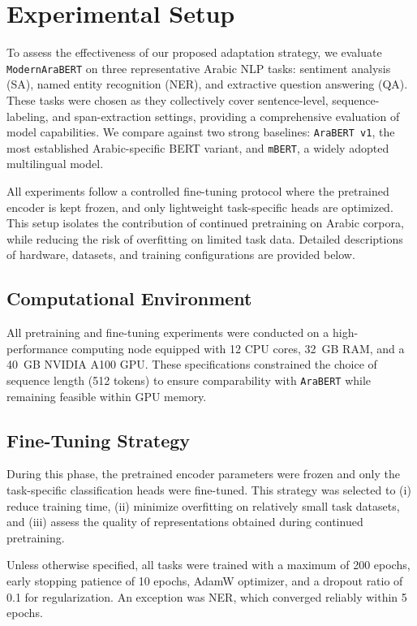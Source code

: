 \section{Experimental Setup}

To assess the effectiveness of our proposed adaptation strategy, we evaluate \texttt{ModernAraBERT} on three representative Arabic NLP tasks: sentiment analysis (SA), named entity recognition (NER), and extractive question answering (QA). These tasks were chosen as they collectively cover sentence-level, sequence-labeling, and span-extraction settings, providing a comprehensive evaluation of model capabilities. We compare against two strong baselines: \texttt{AraBERT v1}, the most established Arabic-specific BERT variant, and \texttt{mBERT}, a widely adopted multilingual model.  

All experiments follow a controlled fine-tuning protocol where the pretrained encoder is kept frozen, and only lightweight task-specific heads are optimized. This setup isolates the contribution of continued pretraining on Arabic corpora, while reducing the risk of overfitting on limited task data. Detailed descriptions of hardware, datasets, and training configurations are provided below.

\subsection{Computational Environment}
All pretraining and fine-tuning experiments were conducted on a high-performance computing node equipped with 12 CPU cores, 32~GB RAM, and a 40~GB NVIDIA A100 GPU. These specifications constrained the choice of sequence length (512 tokens) to ensure comparability with \texttt{AraBERT} while remaining feasible within GPU memory.  

\subsection{Fine-Tuning Strategy}
During this phase, the pretrained encoder parameters were frozen and only the task-specific classification heads were fine-tuned. This strategy was selected to 
(i) reduce training time,  
(ii) minimize overfitting on relatively small task datasets, and  
(iii) assess the quality of representations obtained during continued pretraining.  

Unless otherwise specified, all tasks were trained with a maximum of 200 epochs, early stopping patience of 10 epochs, AdamW optimizer, and a dropout ratio of 0.1 for regularization. An exception was NER, which converged reliably within 5 epochs.

